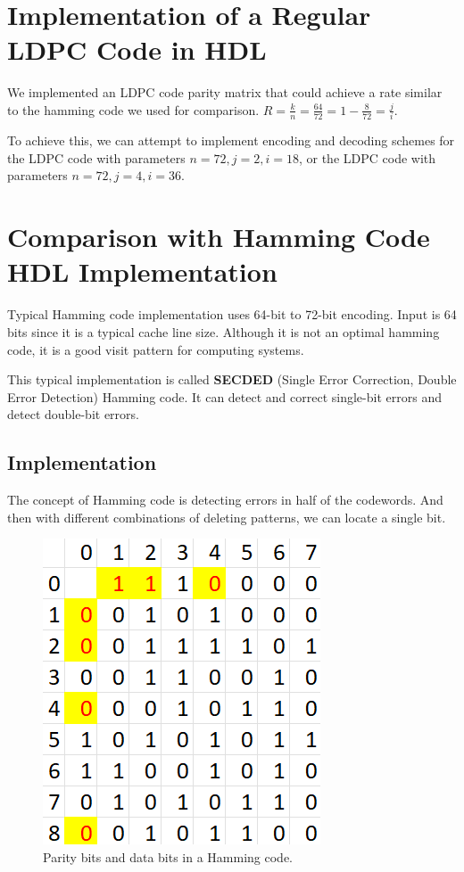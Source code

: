 \documentclass[conference]{IEEEtran}
\begin{document}
\section{Implementation of a Regular LDPC Code in HDL}
We implemented an LDPC code parity matrix that could achieve a rate similar to
the hamming code we used for comparison.
$R=\frac{k}{n}=\frac{64}{72}=1-\frac{8}{72} = \frac{j}{i}$.

To achieve this, we can attempt to implement encoding and decoding schemes for
the LDPC code with parameters $n=72, j=2, i=18$, or the LDPC code with
parameters $n=72, j=4, i=36$.

\section{Comparison with Hamming Code HDL Implementation}
Typical Hamming code implementation uses 64-bit to 72-bit encoding. Input is 64
bits since it is a typical cache line size. Although it is not an optimal
hamming code, it is a good visit pattern for computing systems.

This typical implementation is called \textbf{SECDED} (Single Error Correction,
Double Error Detection) Hamming code. It can detect and correct single-bit
errors and detect double-bit errors.
\subsection{Implementation}
The concept of Hamming code is detecting errors in half of the codewords. And
then with different combinations of deleting patterns, we can locate a single
bit.

\begin{figure}[htbp]
  \centerline{\includegraphics{Images/Hamming_example.png}}
  \caption{Parity bits and data bits in a Hamming code.}
  \label{fig_2}
\end{figure}
\end{document}
